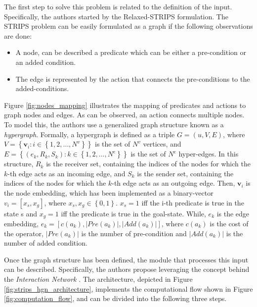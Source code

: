 The first step to solve this problem is related to the definition of the input. Specifically, the authors started by the Relaxed-STRIPS formulation. The STRIPS problem can be easily formulated as a graph if the following observations are done:
\begin{itemize}
    \item A node, can be described a predicate which can be either a pre-condition or an added condition.
    \item The edge is represented by the action that connects the pre-conditions to the added-conditions. 
\end{itemize}

Figure \ref{fig:nodes_mapping} illustrates the mapping of predicates and actions to graph nodes and edges. As can be observed, an action connects multiple nodes. To model this, the authors use a generalized graph structure known as a \textit{hypergraph}. Formally, a hypergraph is defined as a triple $G = (u, V, E)$, where $V = \left\{ \textbf{v}_{i}: i \in \left\{1, 2, \dots, N^{v} \right\} \right\}$ is the set of $N^{v}$ vertices, and $E = \left\{ (e_{k}, R_{k}, S_{k}): k \in \left\{1, 2, \dots, N^{e} \right\} \right\}$ is the set of $N^{e}$ hyper-edges. In this structure, $R_{k}$ is the receiver set, containing the indices of the nodes for which the $k$-th edge acts as an incoming edge, and $S_{k}$ is the sender set, containing the indices of the nodes for which the $k$-th edge acts as an outgoing edge. Then, $\textbf{v}_{i}$ is the node embedding, which has been implemented as a binary-vector $v_i = [x_s, x_g]$, where $x_s, x_g \in \left\{0,1\right\}$. $x_s=1$ iff the i-th predicate is true in the state s and $x_g=1$ iff the predicate is true in the goal-state. While, $e_{k}$ is the edge embedding, $e_k = [c(a_k), |Pre(a_k)|, |Add(a_k)|]$, where $c(a_k)$ is the cost of the operator, $|Pre(a_k)|$ is the number of pre-condition and $|Add(a_k)|$ is the number of added condition.



Once the graph structure has been defined, the module that processes this input can be described. Specifically, the authors propose leveraging the concept behind the \textit{Interaction Network} \cite{battaglia2016interaction}. The architecture, depicted in Figure \ref{fig:strips_hgn_architecture}, implements the computational flow shown in Figure \ref{fig:computation_flow}, and can be divided into the following three steps.

